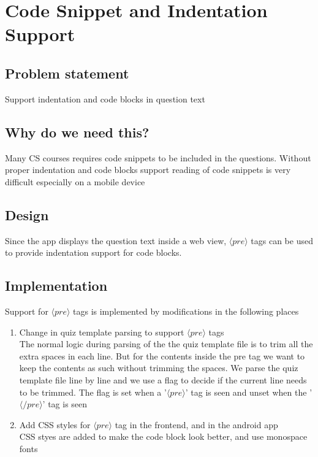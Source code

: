 \clearpage
\section{Code Snippet and Indentation Support} 
\hspace{0.5cm} 
    
   
\subsection{Problem statement}
	Support indentation and code blocks in question text

\subsection{Why do we need this?}
	Many CS courses requires code snippets to be included in the questions. Without proper indentation and code blocks support reading of code snippets is very difficult especially on a mobile device 

\subsection{Design}
	Since the app displays the question text inside a web view, $\langle pre \rangle$ tags can be used to provide indentation support for code blocks. 

\subsection{Implementation}
	Support for $\langle pre \rangle$ tags is implemented by modifications in the following places

    \begin{enumerate}
        \item Change in quiz template parsing to support $\langle pre \rangle$ tags\\ 
        The normal logic during parsing of the the quiz template file is to trim all the extra spaces in each line. But for the contents inside the pre tag we want to keep the contents as such without trimming the spaces. We parse the quiz template file line by line and we use a flag to decide if the current line needs to be trimmed. The flag is set when a '$\langle pre \rangle$' tag is seen and unset when the '$\langle /pre \rangle$' tag is seen
        \item Add CSS styles for $\langle pre \rangle$ tag in the frontend, and in the android app\\
        CSS styes are added to make the code block look better, and use monospace fonts
    \end{enumerate}	
